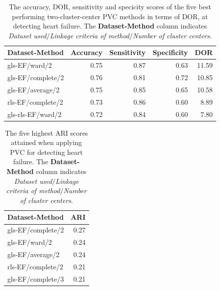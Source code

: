\begin{table}[htb]
    \centering
    \begin{tabular}{lrrrr}
        \toprule
        Dataset-Method    &  Accuracy &  Sensitivity &  Specificity &   DOR \\
        \midrule
        gls-EF/ward/2     &      0.75 &         0.87 &         0.63 & 11.59 \\
        gls-EF/complete/2 &      0.76 &         0.81 &         0.72 & 10.85 \\
        gls-EF/average/2  &      0.75 &         0.85 &         0.65 & 10.58 \\
        rls-EF/complete/2 &      0.73 &         0.86 &         0.60 &  8.89 \\
        gls-rls-EF/ward/2 &      0.72 &         0.84 &         0.60 &  7.80 \\
        \bottomrule
    \end{tabular}
    \caption{The accuracy, DOR, sensitivity and specicity scores of the five best performing two-cluster-center PVC methods in terms of DOR, at detecting heart failure.
             The \textbf{Dataset-Method} column indicates \textit{Dataset used}$/$\textit{Linkage criteria of method}$/$\textit{Number of cluster centers}.}
    \label{tab:pvc_hf_dor_sens_spec_dist}
\end{table}

\begin{table}[htb]
    \centering
    \begin{tabular}{lr}
        \toprule
        Dataset-Method    &  ARI \\
        \midrule
        gls-EF/complete/2 & 0.27 \\
        gls-EF/ward/2     & 0.24 \\
        gls-EF/average/2  & 0.24 \\
        rls-EF/complete/2 & 0.21 \\
        gls-EF/complete/3 & 0.21 \\
        \bottomrule
    \end{tabular}
    \caption{The five highest ARI scores attained when applying PVC for detecting heart failure.
             The \textbf{Dataset-Method} column indicates \textit{Dataset used}$/$\textit{Linkage criteria of method}$/$\textit{Number of cluster centers}.}
    \label{tab:pvc_hf_ari}
\end{table}

\newpage

